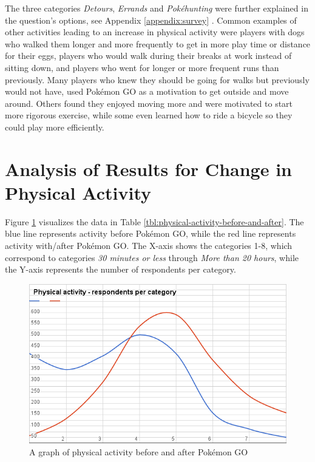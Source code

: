 The three categories \emph{Detours}, \emph{Errands} and \emph{Pokéhunting} were further explained in the question's options, see Appendix \ref{appendix:survey} . Common examples of other activities leading to an increase in physical activity were players with dogs who walked them longer and more frequently to get in more play time or distance for their eggs, players who would walk during their breaks at work instead of sitting down, and players who went for longer or more frequent runs than previously. Many players who knew they should be going for walks but previously would not have, used Pokémon GO as a motivation to get outside and move around. Others found they enjoyed moving more and were motivated to start more rigorous exercise, while some even learned how to ride a bicycle so they could play more efficiently. 


\section{Analysis of Results for Change in Physical Activity}

Figure \ref{fig:physical-activity-graph} visualizes the data in Table \ref{tbl:physical-activity-before-and-after}. The blue line represents activity before Pokémon GO, while the red line represents activity with/after Pokémon GO. The X-axis shows the categories 1-8, which correspond to categories \emph{30 minutes or less} through \emph{More than 20 hours}, while the Y-axis represents the number of respondents per category.

\begin{figure}[h]
	\centering
	\includegraphics[width=\textwidth]{Figures/physical-activity-graph}
	\caption{A graph of physical activity before and after Pokémon GO}
	\label{fig:physical-activity-graph}
\end{figure}

